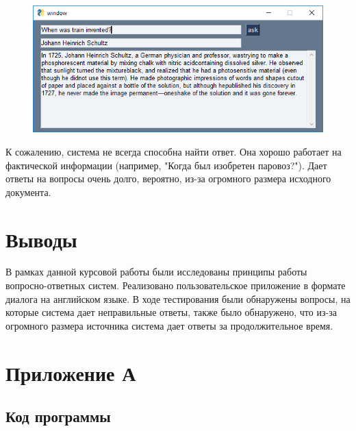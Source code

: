 \documentclass[a4paper,12pt,preview]{report} %
\begin{document}
	\begin{figure}[H]
		\centering\includegraphics{q1.PNG}
		\caption{}
		\label{fig:get}
	\end{figure}
	
	К сожалению, система не всегда способна найти ответ. Она хорошо работает на фактической информации (например, "Когда был изобретен паровоз?"). Дает ответы на вопросы очень долго, вероятно, из-за огромного размера исходного документа.
	
	\chapter{Выводы}
	
	В рамках данной курсовой работы были исследованы принципы работы вопросно-ответных систем. Реализовано пользовательское приложение в формате диалога на английском языке. В ходе тестирования были обнаружены вопросы, на которые система дает неправильные ответы, также было обнаружено, что из-за огромного размера источника система дает ответы за продолжительное время.
	
	\chapter{Приложение А}
	
	\section{Код программы}
	
\end{document}
